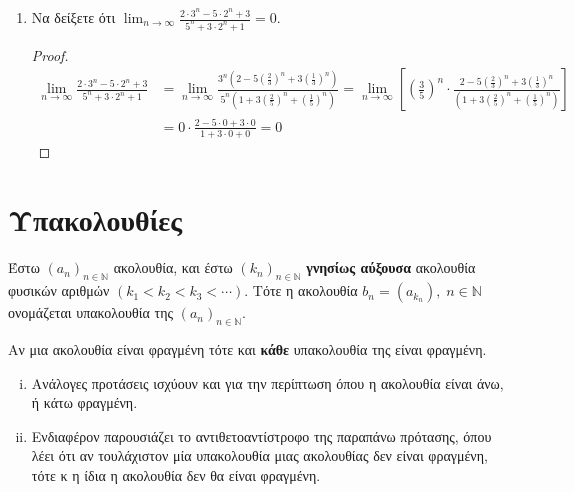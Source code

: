 \documentclass[a4paper,table]{report}
\begin{document}
\begin{enumerate}
  \item Να δείξετε ότι $ \lim_{n \to \infty} \frac{2\cdot 3^{n} -5 \cdot 2^{n} +
    3}{5^{n}+3 \cdot 2^{n}+1} = 0 $.
    \begin{proof}
      \begin{align*}
       \lim_{n \to \infty} \frac{2\cdot 3^{n} -5 \cdot 2^{n} + 3}{5^{n}+3 
       \cdot 2^{n}+1} 
       &= \lim_{n \to \infty} \frac{3^{n}\left(2-5(\frac{2}{3})^{n}+3(\frac{1}{3}
 )^{n}\right)}{5^{n}\left(1+3(\frac{2}{5} )^{n}+(\frac{1}{5} )^{n}\right)} = 
 \lim_{n \to \infty} \left[\left(\frac{3}{5} \right)^{n} \cdot \frac{2-5(\frac{2}{3})^{n}+3(\frac{1}{3}
 )^{n}}{\left(1+3(\frac{2}{5} )^{n}+(\frac{1}{5} )^{n}\right)}\right] \\
 &= 0\cdot \frac{2 - 5\cdot 0+ 3\cdot 0}{1+3\cdot 0 + 0} = 0
      \end{align*} 
    \end{proof}
\end{enumerate}

\section{Υπακολουθίες}

\begin{mybox1}
  \begin{dfn}
    Έστω $ (a_{n})_{n \in \mathbb{N}} $ ακολουθία, και έστω $ 
    (k_{n})_{n \in \mathbb{N}} $ \textbf{γνησίως αύξουσα} ακολουθία φυσικών αριθμών $ (k_{1}<k_{2}<k_{3}<\cdots) $. 
    Τότε η ακολουθία $ b_{n} = (a_{k_{n}}), \; n \in \mathbb{N} $ 
    ονομάζεται \textcolor{Col1}{υπακολουθία} της 
    $ (a_{n})_{n \in \mathbb{N}} $.
  \end{dfn}
\end{mybox1}


\begin{mybox3}
  \begin{prop}
    Αν μια ακολουθία είναι φραγμένη τότε και \textbf{κάθε} υπακολουθία της 
    είναι φραγμένη.
  \end{prop}
\end{mybox3}

\begin{rem}
\item {}
  \begin{enumerate}[i)]
    \item Ανάλογες προτάσεις ισχύουν και για την περίπτωση όπου η 
      ακολουθία είναι άνω, ή κάτω φραγμένη.
    \item 
      Ενδιαφέρον παρουσιάζει το αντιθετοαντίστροφο της παραπάνω 
      πρότασης, όπου λέει ότι αν τουλάχιστον μία υπακολουθία μιας 
      ακολουθίας δεν είναι φραγμένη, τότε κ η ίδια η ακολουθία 
      δεν θα είναι φραγμένη.
  \end{enumerate}
\end{rem}
\end{document}
